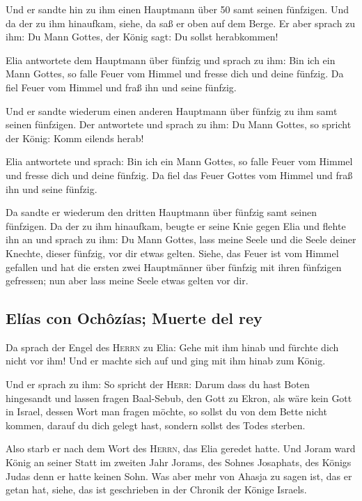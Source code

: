  Und er sandte hin zu ihm einen Hauptmann über 50 samt
seinen fünfzigen. Und da der zu ihm hinaufkam, siehe, da saß er oben auf
dem Berge. Er aber sprach zu ihm: Du Mann Gottes, der König sagt: Du
sollst herabkommen!

 Elia antwortete dem Hauptmann über fünfzig und sprach zu
ihm: Bin ich ein Mann Gottes, so falle Feuer vom Himmel und fresse dich
und deine fünfzig. Da fiel Feuer vom Himmel und fraß ihn und seine
fünfzig.

 Und er sandte wiederum einen anderen Hauptmann über
fünfzig zu ihm samt seinen fünfzigen. Der antwortete und sprach zu ihm:
Du Mann Gottes, so spricht der König: Komm eilends herab!

 Elia antwortete und sprach: Bin ich ein Mann Gottes, so
falle Feuer vom Himmel und fresse dich und deine fünfzig. Da fiel das
Feuer Gottes vom Himmel und fraß ihn und seine fünfzig.

 Da sandte er wiederum den dritten Hauptmann über fünfzig
samt seinen fünfzigen. Da der zu ihm hinaufkam, beugte er seine Knie
gegen Elia und flehte ihn an und sprach zu ihm: Du Mann Gottes, lass
meine Seele und die Seele deiner Knechte, dieser fünfzig, vor dir etwas
gelten.  Siehe, das Feuer ist vom Himmel gefallen und hat
die ersten zwei Hauptmänner über fünfzig mit ihren fünfzigen gefressen;
nun aber lass meine Seele etwas gelten vor dir.

\hypertarget{eluxedas-con-ochuxf4zuxedas-muerte-del-rey}{%
\subsection{Elías con Ochôzías; Muerte del
rey}\label{eluxedas-con-ochuxf4zuxedas-muerte-del-rey}}

 Da sprach der Engel des \textsc{Herrn} zu Elia: Gehe mit
ihm hinab und fürchte dich nicht vor ihm! Und er machte sich auf und
ging mit ihm hinab zum König.

 Und er sprach zu ihm: So spricht der \textsc{Herr}:
Darum dass du hast Boten hingesandt und lassen fragen Baal-Sebub, den
Gott zu Ekron, als wäre kein Gott in Israel, dessen Wort man fragen
möchte, so sollst du von dem Bette nicht kommen, darauf du dich gelegt
hast, sondern sollst des Todes sterben.

 Also starb er nach dem Wort des \textsc{Herrn}, das Elia
geredet hatte. Und Joram ward König an seiner Statt im zweiten Jahr
Jorams, des Sohnes Josaphats, des Königs Judas denn er hatte keinen
Sohn.  Was aber mehr von Ahasja zu sagen ist, das er
getan hat, siehe, das ist geschrieben in der Chronik der Könige Israels.

